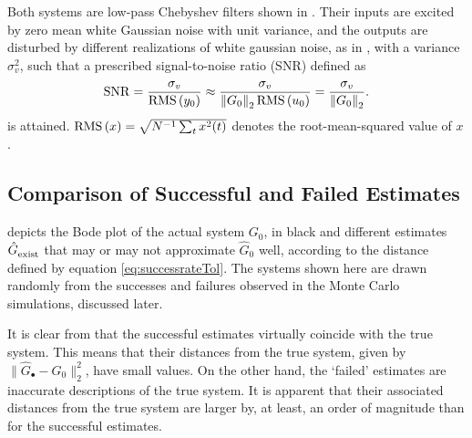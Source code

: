 Both systems are low-pass Chebyshev filters shown in . Their inputs are excited by zero mean white Gaussian noise with unit variance, and the outputs are disturbed by different realizations of white gaussian noise, as in , with a variance $\sigma_v^2$, such that a prescribed signal-to-noise ratio (SNR) defined as
\begin{equation}
  \mathrm{SNR} 
    = \frac{\sigma_v}
           {\operatorname{RMS} \left( y_0 \right)}
    \approx \frac{\sigma_{v}}
                 {\left\| G_0 \right\|_2 \operatorname{RMS} \left( u_0 \right)}
    =  \frac{\sigma_{v}}
            {\left\| G_0 \right\|_2}
  \label{eq:SNR-definition}
  \text{.}
\end{equation}
is attained.
$\operatorname{RMS} \left( x \right) = \sqrt{N^{-1} \sum_t x^2(t)}$ denotes the root-mean-squared value of $x$.


\subsection{Comparison of Successful and Failed Estimates}


  depicts the Bode plot of the actual system $G_0$, in black
 and different estimates $\hat{G}_{\mathrm{exist}}^{\mathrm{}}$
 that may or may not approximate $\hat{G}_{0}$ well, according to the distance defined by equation \eqref{eq:successrateTol}.
 The systems shown here are drawn randomly from the successes and failures observed in the Monte Carlo simulations, discussed later.
 
 It is clear from  that the successful estimates virtually coincide with the true system. This means 
that their distances from the true system, given by $\|\hat G_\mathrm{\bullet} - G_0\|_2^2$, have small values. On the other hand, the `failed' estimates are inaccurate descriptions of the true system. It is apparent that their associated distances from the true system are larger by, at least, an order of magnitude than for the successful estimates.
 
